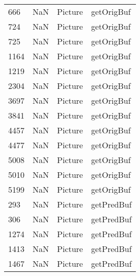 \begin{tabular}{llll}
666  &                   NaN &                    Picture &                                getOrigBuf \\
724  &                   NaN &                    Picture &                                getOrigBuf \\
725  &                   NaN &                    Picture &                                getOrigBuf \\
1164 &                   NaN &                    Picture &                                getOrigBuf \\
1219 &                   NaN &                    Picture &                                getOrigBuf \\
2304 &                   NaN &                    Picture &                                getOrigBuf \\
3697 &                   NaN &                    Picture &                                getOrigBuf \\
3841 &                   NaN &                    Picture &                                getOrigBuf \\
4457 &                   NaN &                    Picture &                                getOrigBuf \\
4477 &                   NaN &                    Picture &                                getOrigBuf \\
5008 &                   NaN &                    Picture &                                getOrigBuf \\
5010 &                   NaN &                    Picture &                                getOrigBuf \\
5199 &                   NaN &                    Picture &                                getOrigBuf \\
293  &                   NaN &                    Picture &                                getPredBuf \\
306  &                   NaN &                    Picture &                                getPredBuf \\
1274 &                   NaN &                    Picture &                                getPredBuf \\
1413 &                   NaN &                    Picture &                                getPredBuf \\
1467 &                   NaN &                    Picture &                                getPredBuf \\

\end{tabular}
